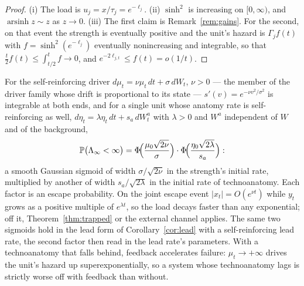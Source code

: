 \begin{proof}
(i) The load is $u_j=x/\tau_j=e^{-\ell_j}$. (ii) $\sinh^2$ is increasing on
$[0,\infty)$, and $\operatorname{arsinh}z\sim z$ as $z\to0$. (iii) The
first claim is Remark~\ref{rem:gains}. For the second, on that event the
strength is eventually positive and the unit's hazard is $\Gamma_jf(t)$
with $f=\sinh^2(e^{-\ell_j})$ eventually nonincreasing and integrable, so
that $\tfrac t2f(t)\le\int_{t/2}^tf\to0$, and
$e^{-2\ell_{j,t}}\le f(t)=o(1/t)$.
\end{proof}

\begin{corollary}\label{cor:solvable}
For the self-reinforcing driver $d\mu_t=\nu\mu_t\,dt+\sigma\,dW_t$,
$\nu>0$ --- the member of the driver family whose drift is
proportional to its state ---
$s'(v)=e^{-\nu v^2/\sigma^2}$ is integrable at both ends, and for a single
unit whose anatomy rate is self-reinforcing as well,
$d\eta_t=\lambda\eta_t\,dt+s_a\,dW^{a}_t$ with $\lambda>0$ and $W^a$
independent of $W$ and of the background,
\begin{equation}\label{eq:sigmoid}
\mathbb{P}\bigl(\Lambda_\infty<\infty\bigr)
=\Phi\!\Bigl(\frac{\mu_0\sqrt{2\nu}}{\sigma}\Bigr)\cdot\Phi\!\Bigl(\frac{\eta_0\sqrt{2\lambda}}{s_a}\Bigr):
\end{equation}
a smooth Gaussian sigmoid of width $\sigma/\sqrt{2\nu}$ in the strength's
initial rate, multiplied by another of width $s_a/\sqrt{2\lambda}$ in the
initial rate of technoanatomy. Each factor is an escape probability. On
the joint escape event $|x_t|=O(e^{\nu t})$ while $y_t$ grows as a positive
multiple of $e^{\lambda t}$, so the load decays faster than any
exponential; off it, Theorem~\ref{thm:trapped} or the external channel
applies. The same two sigmoids hold in the lead form of
Corollary~\ref{cor:lead} with a self-reinforcing lead rate, the second
factor then read in the lead rate's parameters. With a technoanatomy that
falls behind, feedback accelerates failure: $\mu_t\to+\infty$ drives the
unit's hazard up superexponentially, so a system whose technoanatomy lags
is strictly worse off with feedback than without.
\end{corollary}

